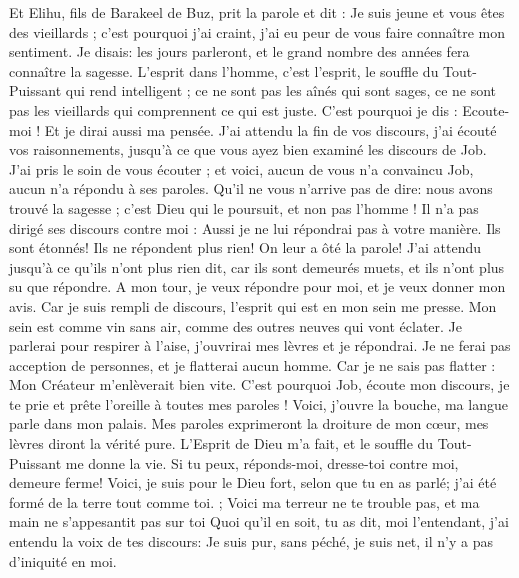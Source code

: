 \begin{multicols}{2}
Et Elihu, fils de Barakeel de Buz, prit la parole et dit : Je suis jeune et vous êtes des vieillards ; c'est pourquoi j'ai craint, j'ai eu peur de vous faire connaître mon sentiment.
Je disais: les jours parleront, et le grand nombre des années fera connaître la sagesse.
L'esprit dans l'homme, c'est l'esprit, le souffle du Tout-Puissant qui rend intelligent ;
ce ne sont pas les aînés qui sont sages, ce ne sont pas les vieillards qui comprennent ce qui est juste.
C'est pourquoi je dis : Ecoute-moi ! Et je dirai aussi ma pensée.
J'ai attendu la fin de vos discours, j'ai écouté vos raisonnements, jusqu'à ce que vous ayez bien examiné les discours de Job.
J'ai pris le soin de vous écouter ; et voici, aucun de vous n'a convaincu Job, aucun n'a répondu à ses paroles.
Qu'il ne vous n'arrive pas de dire: nous avons trouvé la sagesse ; c'est Dieu qui le poursuit, et non pas l'homme !
Il n'a pas dirigé ses discours contre moi : Aussi je ne lui répondrai pas à votre manière.
Ils sont étonnés! Ils ne répondent plus rien! On leur a ôté la parole!
J'ai attendu jusqu'à ce qu'ils n'ont plus rien dit, car ils sont demeurés muets, et ils n'ont plus su que répondre.
A mon tour, je veux répondre pour moi, et je veux donner mon avis.
Car je suis rempli de discours, l'esprit qui est en mon sein me presse.
Mon sein est comme vin sans air, comme des outres neuves qui vont éclater.
Je parlerai pour respirer à l'aise, j'ouvrirai mes lèvres et je répondrai.
Je ne ferai pas acception de personnes, et je flatterai aucun homme.
Car je ne sais pas flatter : Mon Créateur m'enlèverait bien vite.
\VerseOne{}C'est pourquoi Job, écoute mon discours, je te prie et prête l'oreille à toutes mes paroles !
Voici, j'ouvre la bouche, ma langue parle dans mon palais.
Mes paroles exprimeront la droiture de mon cœur, mes lèvres diront la vérité pure.
L'Esprit de Dieu m'a fait, et le souffle du Tout-Puissant me donne la vie.
Si tu peux, réponds-moi, dresse-toi contre moi, demeure ferme!
Voici, je suis pour le Dieu fort, selon que tu en as parlé; j'ai été formé de la terre tout comme toi. ;
Voici ma terreur ne te trouble pas, et ma main ne s'appesantit pas sur toi
Quoi qu'il en soit, tu as dit, moi l'entendant, j'ai entendu la voix de tes discours:
Je suis pur, sans péché, je suis net, il n'y a pas d'iniquité en moi.

\end{multicols}

